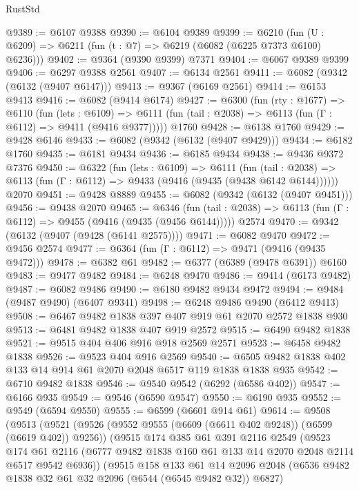 \begin{lexlean}{RustStd}
\begin{coremodule}
@9389 := @6107 @9388
@9390 := @6104 @9389
@9399 := @6210 (fun (U : @6209) => @6211 (fun (t : @7) => @6219 (@6082 (@6225 @7373 @6100) @6236)))
@9402 := @9364 (@9390 @9399) @7371
@9404 := @6067 @9389 @9399
@9406 := @6297 @9388 @2561
@9407 := @6134 @2561
@9411 := @6082 (@9342 (@6132 (@9407 @6147)))
@9413 := @9367 (@6169 @2561)
@9414 := @6153 @9413
@9416 := @6082 (@9414 @6174)
@9427 := @6300
    (fun (rty : @1677) =>
    @6110
      (fun (lets : @6109) =>
      @6111 (fun (tail : @2038) => @6113 (fun (Γ : @6112) => @9411 (@9416 @9377)))))
    @1760
@9428 := @6138 @1760
@9429 := @9428 @6146
@9433 := @6082 (@9342 (@6132 (@9407 @9429)))
@9434 := @6182 @1760
@9435 := @6181 @9434
@9436 := @6185 @9434
@9438 := @9436 @9372 @7376
@9450 := @6322
    (fun (lets : @6109) =>
    @6111
      (fun (tail : @2038) => @6113 (fun (Γ : @6112) => @9433 (@9416 (@9435 (@9438 @6142 @6144))))))
    @2070
@9451 := @9428 @8889
@9455 := @6082 (@9342 (@6132 (@9407 @9451)))
@9456 := @9438 @2070
@9465 := @6346
    (fun (tail : @2038) => @6113 (fun (Γ : @6112) => @9455 (@9416 (@9435 (@9456 @6144)))))
    @2574
@9470 := @9342 (@6132 (@9407 (@9428 (@6141 @2575))))
@9471 := @6082 @9470
@9472 := @9456 @2574
@9477 := @6364 (fun (Γ : @6112) => @9471 (@9416 (@9435 @9472)))
@9478 := @6382 @61
@9482 := @6377 (@6389 (@9478 @6391)) @6160
@9483 := @9477 @9482
@9484 := @6248 @9470
@9486 := @9414 (@6173 @9482)
@9487 := @6082 @9486
@9490 := @6180 @9482 @9434 @9472
@9494 := @9484 (@9487 @9490) (@6407 @9341)
@9498 := @6248 @9486 @9490 (@6412 @9413)
@9508 := @6467 @9482 @1838 @397 @407 @919 @61 @2070 @2572 @1838 @930
@9513 := @6481 @9482 @1838 @407 @919 @2572
@9515 := @6490 @9482 @1838
@9521 := @9515 @404 @406 @916 @918 @2569 @2571
@9523 := @6458 @9482 @1838
@9526 := @9523 @404 @916 @2569
@9540 := @6505 @9482 @1838 @402 @133 @14 @914 @61 @2070 @2048 @6517 @119 @1838 @1838 @935
@9542 := @6710 @9482 @1838
@9546 := @9540 @9542 (@6292 (@6586 @402))
@9547 := @6166 @935
@9549 := @9546 (@6590 @9547)
@9550 := @6190 @935
@9552 := @9549 (@6594 @9550)
@9555 := @6599 (@6601 @914 @61)
@9614 := @9508
    (@9513
      (@9521
        (@9526 (@9552 @9555 (@6609 (@6611 @402 @9248)) (@6599 (@6619 @402)) @9256))
        (@9515
          @174
          @385
          @61
          @391
          @2116
          @2549
          (@9523
            @174
            @61
            @2116
            (@6777 @9482 @1838 @160 @61 @133 @14 @2070 @2048 @2114 @6517 @9542 @6936))
          (@9515
            @158
            @133
            @61
            @14
            @2096
            @2048
            (@6536 @9482 @1838 @32 @61 @32 @2096 (@6544 (@6545 @9482 @32)) @6827)

\end{coremodule}
\end{lexlean}
